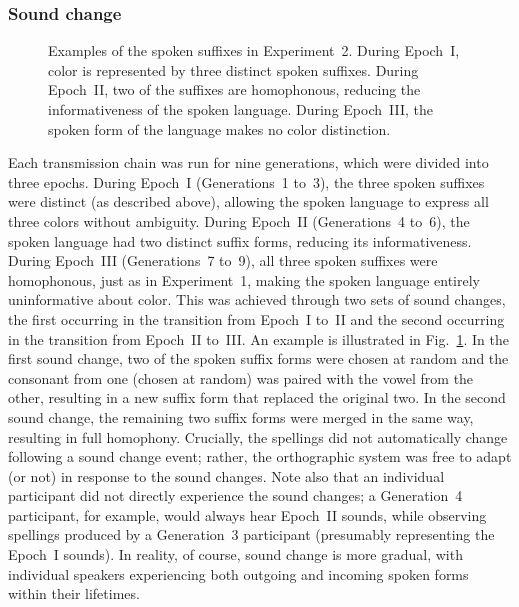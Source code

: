\documentclass[doc,biblatex]{apa7}
\begin{document}
\subsubsection{Sound change}

	\begin{figure}
	\vspace*{2pt}
	\caption{Examples of the spoken suffixes in Experiment~2. During Epoch~I, color is represented by three distinct spoken suffixes. During Epoch~II, two of the suffixes are homophonous, reducing the informativeness of the spoken language. During Epoch~III, the spoken form of the language makes no color distinction.}
	\label{sound_change}
	\end{figure}

Each transmission chain was run for nine generations, which were divided into three epochs. During Epoch~I (Generations~1 to~3), the three spoken suffixes were distinct (as described above), allowing the spoken language to express all three colors without ambiguity. During Epoch~II (Generations~4 to~6), the spoken language had two distinct suffix forms, reducing its informativeness. During Epoch~III (Generations~7 to~9), all three spoken suffixes were homophonous, just as in Experiment~1, making the spoken language entirely uninformative about color. This was achieved through two sets of sound changes, the first occurring in the transition from Epoch~I to~II and the second occurring in the transition from Epoch~II to~III. An example is illustrated in Fig.~\ref{sound_change}. In the first sound change, two of the spoken suffix forms were chosen at random and the consonant from one (chosen at random) was paired with the vowel from the other, resulting in a new suffix form that replaced the original two. In the second sound change, the remaining two suffix forms were merged in the same way, resulting in full homophony. Crucially, the spellings did not automatically change following a sound change event; rather, the orthographic system was free to adapt (or not) in response to the sound changes. Note also that an individual participant did not directly experience the sound changes; a Generation~4 participant, for example, would always hear Epoch~II sounds, while observing spellings produced by a Generation~3 participant (presumably representing the Epoch~I sounds). In reality, of course, sound change is more gradual, with individual speakers experiencing both outgoing and incoming spoken forms within their lifetimes.
\end{document}
